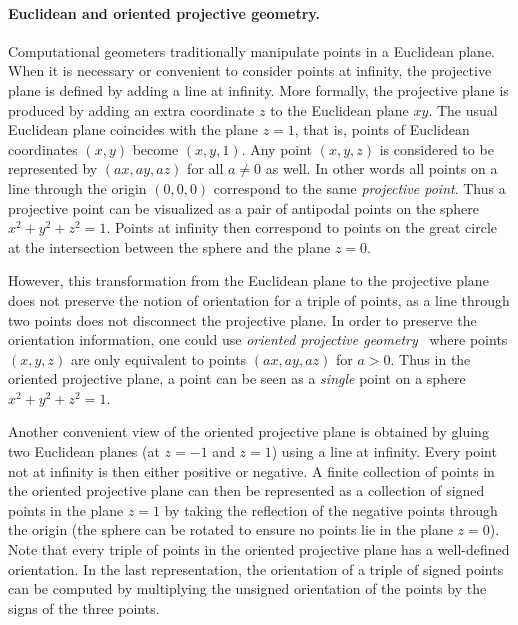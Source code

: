 \documentclass[leqno,12pt]{article}
\begin{document}
\paragraph{Euclidean and oriented projective geometry.}
Computational geometers traditionally manipulate points in a Euclidean
plane. When it is necessary or convenient to consider points
at infinity, the projective plane is defined by adding a line at
infinity. More formally, the projective plane is produced by
adding an extra coordinate $z$ to the Euclidean plane $xy$. 
The usual Euclidean plane coincides with the plane $z=1$, that is,
points of Euclidean coordinates $(x,y)$ become $(x,y,1)$. Any point
$(x,y,z)$ is considered to be represented by $(ax,ay,az)$ for all
$a \neq 0$ as well. In other words all points on a line through
the origin $(0,0,0)$ correspond to the same \emph{projective point}.
Thus a projective point can be visualized as a pair of antipodal points on
the sphere $x^2+y^2+z^2=1$. Points at infinity then correspond to
points on the great circle at the intersection between the sphere and
the plane $z=0$. 

However, this transformation from the Euclidean plane to the
projective plane does not preserve the notion of orientation for a
triple of points, as a line through two points does not disconnect the
projective plane. In order to preserve the orientation information,
one could use \emph{oriented projective geometry}~\cite{DBLP:tibkat_025890042}
where points
$(x,y,z)$ are only equivalent to points $(ax,ay,az)$ for $a>0$. 
Thus in the oriented projective plane, a point can be seen as a
\emph{single} point on a sphere $x^2+y^2+z^2=1$. 

Another convenient view of the oriented
projective plane is obtained by gluing two Euclidean planes (at $z=-1$
and $z=1$) using a line at infinity. Every point not at infinity is
then either positive 
or
 negative. A finite collection of points in
the oriented projective plane can
then be represented as a collection of signed points in the plane
$z=1$ by taking the reflection of the negative points through the
origin (the sphere can be rotated to ensure no points lie in the plane
$z=0$).
Note that every triple of points in the oriented projective plane has
a well-defined orientation. In the last representation, the
orientation of a triple of signed points can be computed by multiplying
the unsigned orientation of the points by the signs of the three
points. \\
\end{document}
